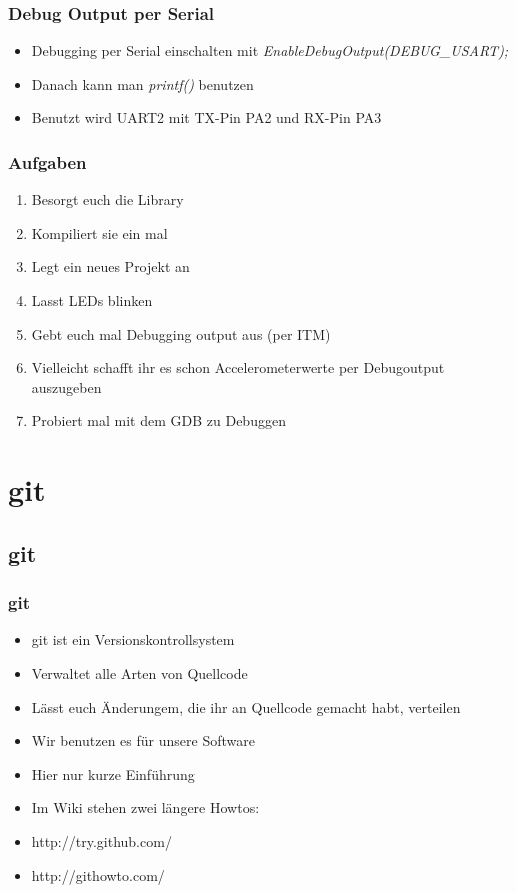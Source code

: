 \documentclass[ngerman,compress]{beamer}
\begin{document}
\begin{frame}
	\frametitle{Debug Output per Serial}
	\begin{itemize}
		\item Debugging per Serial einschalten mit \emph{EnableDebugOutput(DEBUG\_USART);}
		\item Danach kann man \emph{printf()} benutzen
		\item Benutzt wird UART2 mit TX-Pin PA2 und RX-Pin PA3
	\end{itemize}
\end{frame}

\begin{frame}
	\frametitle{Aufgaben}
	\begin{enumerate}
		\item Besorgt euch die Library
		\item Kompiliert sie ein mal
		\item Legt ein neues Projekt an
		\item Lasst LEDs blinken
		\item Gebt euch mal Debugging output aus (per ITM)
		\item Vielleicht schafft ihr es schon Accelerometerwerte per Debugoutput auszugeben
		\item Probiert mal mit dem GDB zu Debuggen
	\end{enumerate}
\end{frame}


\section{git}

\subsection{git}

\begin{frame}
	\frametitle{git}
	\begin{itemize}
		\item git ist ein Versionskontrollsystem
		\item Verwaltet alle Arten von Quellcode
		\item Lässt euch Änderungem, die ihr an Quellcode gemacht habt, verteilen
		\item Wir benutzen es für unsere Software
		\item Hier nur kurze Einführung
		\item Im Wiki stehen zwei längere Howtos:
		\item http://try.github.com/
		\item http://githowto.com/
	\end{itemize}
\end{frame}
\end{document}
